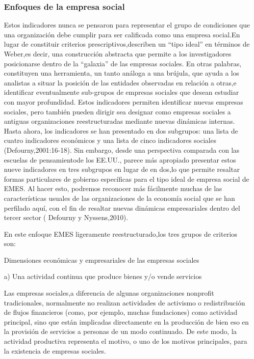 \documentclass[11pt]{article}
\begin{document}
\subsubsection{Enfoques de la empresa social}
\label{sec:orgb54c10c}

Estos indicadores nunca se pensaron para representar el grupo de  condiciones que una organización debe cumplir para ser   calificada como una   empresa social.En lugar de  constituir criterios prescriptivos,describen un  “tipo ideal” en términos de Weber,es  decir, una construcción abstracta que permite a los  investigadores posicionarse dentro de  la “galaxia” de  las  empresas sociales. En  otras palabras, constituyen una   herramienta, un  tanto análoga a una   brújula, que   ayuda a los  analistas a situar la posición de  las  entidades observadas en  relación a otras,e identificar eventualmente sub-grupos de  empresas sociales que   desean estudiar con   mayor profundidad. Estos indicadores permiten  identificar nuevas empresas sociales, pero también pueden dirigir sea designar como empresas sociales a antiguas organizaciones reestructuradas mediante nuevas dinámicas internas. Hasta ahora, los  indicadores se  han   presentado en  dos   subgrupos: una   lista de  cuatro indicadores  económicos y una   lista   de  cinco indicadores sociales (Defourny,2001:16-18). Sin  embargo, desde una   perspectiva comparada con   las  escuelas de  pensamientode  los  EE.UU., parece más apropiado presentar estos nueve indicadores en  tres   subgrupos en  lugar de  en  dos,lo que   permite resaltar formas particulares de  gobierno específicas para el  tipo   ideal de  empresa social de  EMES. Al  hacer esto, podremos reconocer más fácilmente muchas de  las  características usuales de  las  organizaciones de la economía social que   se  han   perfilado aquí, con   el  fin  de  resaltar nuevas dinámicas empresariales dentro del   tercer sector ( Defourny y Nyssens,2010).

En  este enfoque EMES ligeramente reestructurado,los  tres   grupos de  criterios son:

Dimensiones económicas y empresariales de las empresas sociales


a)  Una actividad continua que   produce bienes y/o  vende servicios

Las   empresas sociales,a diferencia de  algunas organizaciones nonprofit tradicionales, normalmente no  realizan actividades de   activismo o redistribución de  flujos financieros (como, por    ejemplo, muchas fundaciones) como actividad principal, sino que    están implicadas directamente en  la producción de  bien eso en  la provisión de  servicios a personas de  un  modo continuado. De  este modo, la actividad productiva representa el  motivo, o uno   de  los  motivos principales, para la existencia de  empresas   sociales.
\end{document}
